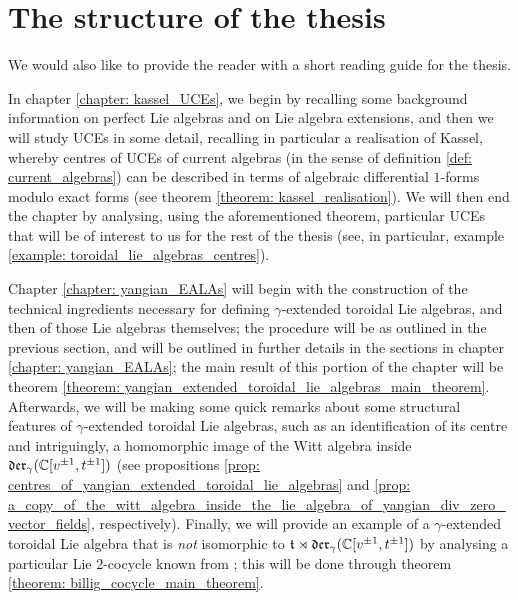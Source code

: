 \section{The structure of the thesis}
    We would also like to provide the reader with a short reading guide for the thesis.
    
    In chapter \ref{chapter: kassel_UCEs}, we begin by recalling some background information on perfect Lie algebras and on Lie algebra extensions, and then we will study UCEs in some detail, recalling in particular a realisation of Kassel, whereby centres of UCEs of current algebras (in the sense of definition \ref{def: current_algebras}) can be described in terms of algebraic differential $1$-forms modulo exact forms (see theorem \ref{theorem: kassel_realisation}). We will then end the chapter by analysing, using the aforementioned theorem, particular UCEs that will be of interest to us for the rest of the thesis (see, in particular, example \ref{example: toroidal_lie_algebras_centres}).

    Chapter \ref{chapter: yangian_EALAs} will begin with the construction of the technical ingredients necessary for defining $\gamma$-extended toroidal Lie algebras, and then of those Lie algebras themselves; the procedure will be as outlined in the previous section, and will be outlined in further details in the sections in chapter \ref{chapter: yangian_EALAs}; the main result of this portion of the chapter will be theorem \ref{theorem: yangian_extended_toroidal_lie_algebras_main_theorem}. Afterwards, we will be making some quick remarks about some structural features of $\gamma$-extended toroidal Lie algebras, such as an identification of its centre and intriguingly, a homomorphic image of the Witt algebra inside $\mathfrak{der}_{\gamma}(\mathbb{C}[v^{\pm 1}, t^{\pm 1}])$ (see propositions \ref{prop: centres_of_yangian_extended_toroidal_lie_algebras} and \ref{prop: a_copy_of_the_witt_algebra_inside_the_lie_algebra_of_yangian_div_zero_vector_fields}, respectively). Finally, we will provide an example of a $\gamma$-extended toroidal Lie algebra that is \textit{not} isomorphic to $\mathfrak{t} \rtimes \mathfrak{der}_{\gamma}(\mathbb{C}[v^{\pm 1}, t^{\pm 1}])$ by analysing a particular Lie $2$-cocycle known from \cite{billig_energy_momentum_tensor}; this will be done through theorem \ref{theorem: billig_cocycle_main_theorem}.